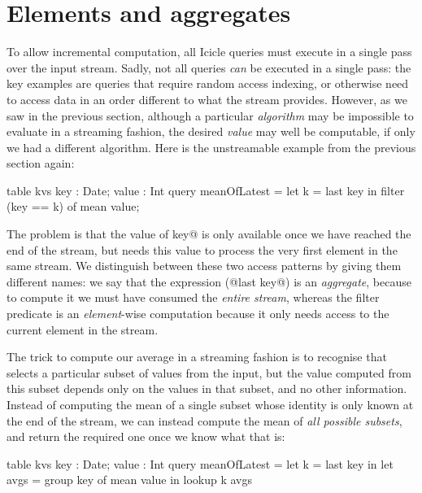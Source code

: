 
\section{Elements and aggregates}
\label{icicle:s:ElementsAndAggregates}
To allow incremental computation, all Icicle queries must execute in a single pass over the input stream.
Sadly, not all queries \emph{can} be executed in a single pass: the key examples are queries that require random access indexing, or otherwise need to access data in an order different to what the stream provides.
However, as we saw in the previous section, although a particular \emph{algorithm} may be impossible to evaluate in a streaming fashion, the desired \emph{value} may well be computable, if only we had a different algorithm.
Here is the unstreamable example from the previous section again:
\begin{icicle}
table kvs { key : Date; value : Int }
query meanOfLatest
 = let k = last key in
   filter (key == k) of mean value;
\end{icicle}

The problem is that the value of \Ic@last key@ is only available once we have reached the end of the stream, but \Ic@filter@ needs this value to process the very first element in the same stream.
We distinguish between these two access patterns by giving them different names: we say that the expression (@last key@) is an \emph{aggregate}, because to compute it we must have consumed the \emph{entire stream}, whereas the filter predicate is an \emph{element}-wise computation because it only needs access to the current element in the stream.

The trick to compute our average in a streaming fashion is to recognise that \Ic@filter@ selects a particular subset of values from the input, but the value computed from this subset depends only on the values in that subset, and no other information. Instead of computing the mean of a single subset whose identity is only known at the end of the stream, we can instead compute the mean of \emph{all possible subsets}, and return the required one once we know what that is:
\begin{icicle}
table kvs { key : Date; value : Int } 
query meanOfLatest
 = let k    = last  key in
   let avgs = group key of mean value in
   lookup k avgs
\end{icicle}

